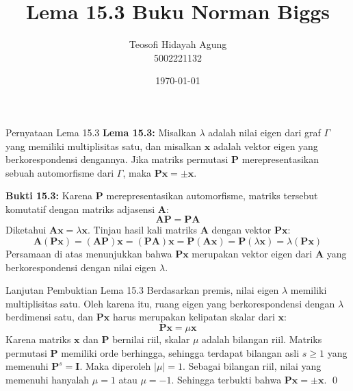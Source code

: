 \documentclass[aspectratio=169]{beamer}
\date{\today}
\title[Aljabar Graf]{Lema 15.3 Buku Norman Biggs}
\author[Teosofi H.\ A.]{Teosofi Hidayah Agung \\ 5002221132}
\institute[Matematika ITS]{Departemen Matematika\\ Institut Teknologi Sepuluh Nopember}
\begin{document}
\frame{\titlepage}

\begin{frame}{Pernyataan Lema 15.3}
  \textbf{Lema 15.3:}
  Misalkan $\lambda$ adalah nilai eigen dari graf $\Gamma$ yang memiliki multiplisitas satu, dan misalkan $\mathbf{x}$ adalah vektor eigen yang berkorespondensi dengannya. Jika matriks permutasi $\mathbf{P}$ merepresentasikan sebuah automorfisme dari $\Gamma$, maka $\mathbf{P}\mathbf{x} = \pm \mathbf{x}$.

  \textbf{Bukti 15.3:} Karena $\mathbf{P}$ merepresentasikan automorfisme, matriks tersebut komutatif dengan matriks adjasensi $\mathbf{A}$:
  $$ \mathbf{A}\mathbf{P} = \mathbf{P}\mathbf{A} $$
  Diketahui $\mathbf{A}\mathbf{x} = \lambda\mathbf{x}$. Tinjau hasil kali matriks $\mathbf{A}$ dengan vektor $\mathbf{P}\mathbf{x}$:
  $$ \mathbf{A}(\mathbf{P}\mathbf{x}) = (\mathbf{A}\mathbf{P})\mathbf{x} = (\mathbf{P}\mathbf{A})\mathbf{x} = \mathbf{P}(\mathbf{A}\mathbf{x}) = \mathbf{P}(\lambda\mathbf{x}) = \lambda(\mathbf{P}\mathbf{x}) $$
  Persamaan di atas menunjukkan bahwa $\mathbf{P}\mathbf{x}$ merupakan vektor eigen dari $\mathbf{A}$ yang berkorespondensi dengan nilai eigen $\lambda$.
\end{frame}

\begin{frame}{Lanjutan Pembuktian Lema 15.3}
  Berdasarkan premis, nilai eigen $\lambda$ memiliki multiplisitas satu. Oleh karena itu, ruang eigen yang berkorespondensi dengan $\lambda$ berdimensi satu, dan $\mathbf{P}\mathbf{x}$ harus merupakan kelipatan skalar dari $\mathbf{x}$:
  $$ \mathbf{P}\mathbf{x} = \mu\mathbf{x} $$
  Karena matriks $\mathbf{x}$ dan $\mathbf{P}$ bernilai riil, skalar $\mu$ adalah bilangan riil. Matriks permutasi $\mathbf{P}$ memiliki orde berhingga, sehingga terdapat bilangan asli $s \geqslant 1$ yang memenuhi $\mathbf{P}^s = \mathbf{I}$.
  Maka diperoleh $|\mu| = 1$. Sebagai bilangan riil, nilai yang memenuhi hanyalah $\mu = 1$ atau $\mu = -1$.
  Sehingga terbukti bahwa $\mathbf{P}\mathbf{x} = \pm \mathbf{x}$. \qed
\end{frame}
\end{document}
